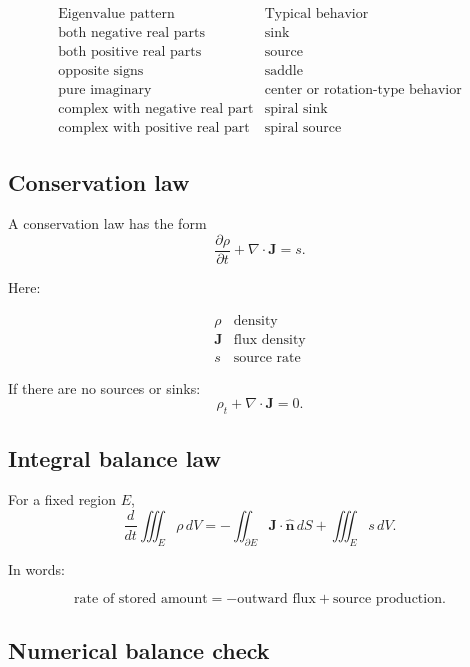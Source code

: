 \[
\begin{array}{c|c}
\text{Eigenvalue pattern} & \text{Typical behavior} \\ \hline
\text{both negative real parts} & \text{sink}\\[1mm]
\text{both positive real parts} & \text{source}\\[1mm]
\text{opposite signs} & \text{saddle}\\[1mm]
\text{pure imaginary} & \text{center or rotation-type behavior}\\[1mm]
\text{complex with negative real part} & \text{spiral sink}\\[1mm]
\text{complex with positive real part} & \text{spiral source}
\end{array}
\]

\subsection*{Conservation law}

A conservation law has the form
\[
\boxed{
    \frac{\partial \rho}{\partial t}
    +
    \nabla\cdot\mathbf J
    =
    s.
}
\]

Here:

\[
\begin{array}{c|c}
\rho & \text{density}\\[1mm]
\mathbf J & \text{flux density}\\[1mm]
s & \text{source rate}
\end{array}
\]

If there are no sources or sinks:
\[
\boxed{
    \rho_t+\nabla\cdot\mathbf J=0.
}
\]

\subsection*{Integral balance law}

For a fixed region \(E\),
\[
\boxed{
    \frac{d}{dt}\iiint_E \rho\,dV
    =
    -\iint_{\partial E}\mathbf J\cdot\widehat{\mathbf n}\,dS
    +
    \iiint_E s\,dV.
}
\]

In words:

\[
\boxed{
    \text{rate of stored amount}
    =
    -\text{outward flux}
    +
    \text{source production}.
}
\]

\subsection*{Numerical balance check}

